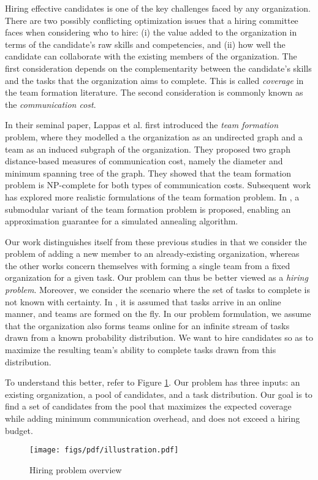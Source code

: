 Hiring effective candidates is one of the key challenges faced by any organization.
There are two possibly conflicting optimization issues that a hiring committee faces when considering who to hire: 
(i) the value added to the organization in terms of the candidate's raw skills and competencies, and 
(ii) how well the candidate can collaborate with the existing members of the organization.
The first consideration depends on the complementarity between the candidate's skills and the tasks that the organization aims to complete. 
This is called \textit{coverage} in the team formation literature.
The second consideration is commonly known as the \textit{communication cost}.

In their seminal paper, Lappas et al. \cite{lappas2009finding} first introduced the \textit{team formation} problem, where they modelled a the organization as an undirected graph and a team as an induced subgraph of the organization.
They proposed two graph distance-based measures of communication cost, namely the diameter and minimum spanning tree of the graph. 
They showed that the team formation problem is NP-complete for both types of communication costs. 
Subsequent work  \cite{sozio2010community, kargar2011discovering, anagnostopoulos2010power, rangapuram2013towards} has explored more realistic formulations of the team  formation problem.
In \cite{bhowmik2014submodularity}, a submodular variant of the team formation problem is proposed, enabling an approximation guarantee for a simulated annealing algorithm.

Our work distinguishes itself from these previous studies in that we consider the problem of adding a new member to an already-existing organization, whereas the other works concern themselves with forming a single team from a fixed organization for a given task.
Our problem can thus be better viewed as a \textit{hiring problem}. Moreover, we consider the scenario where the set of tasks to complete is not known with certainty.
In \cite{anagnostopoulos2012online}, it is assumed that tasks arrive in an online manner, and teams are formed on the fly.
In our problem formulation, we assume that the organization also forms teams online for an infinite stream of tasks drawn from a known probability distribution.
We want to hire candidates so as to maximize the resulting team's ability to complete tasks drawn from this distribution.

To understand this better, refer to Figure \ref{fig:hpo}.
Our problem has three inputs: an existing organization, a pool of candidates, and a task distribution. 
Our goal is to find a set of candidates from the pool that maximizes the expected coverage while adding minimum communication overhead, and does not exceed a hiring budget. 
\begin{figure}
\centering
\begin{small}
\texttt{[image: figs/pdf/illustration.pdf]}
\caption{Hiring problem overview}
\label{fig:hpo}
\end{small}
\end{figure} 

